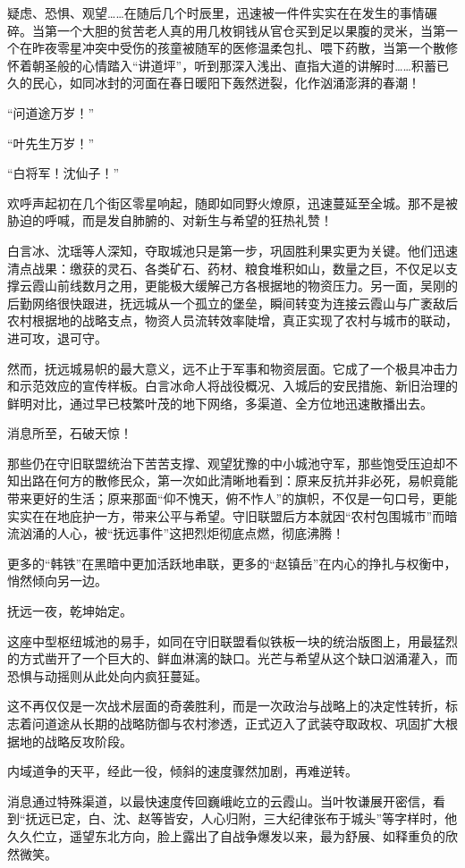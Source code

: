 疑虑、恐惧、观望……在随后几个时辰里，迅速被一件件实实在在发生的事情碾碎。当第一个大胆的贫苦老人真的用几枚铜钱从官仓买到足以果腹的灵米，当第一个在昨夜零星冲突中受伤的孩童被随军的医修温柔包扎、喂下药散，当第一个散修怀着朝圣般的心情踏入“讲道坪”，听到那深入浅出、直指大道的讲解时……积蓄已久的民心，如同冰封的河面在春日暖阳下轰然迸裂，化作汹涌澎湃的春潮！

“问道途万岁！”

“叶先生万岁！”

“白将军！沈仙子！”

欢呼声起初在几个街区零星响起，随即如同野火燎原，迅速蔓延至全城。那不是被胁迫的呼喊，而是发自肺腑的、对新生与希望的狂热礼赞！

白言冰、沈瑶等人深知，夺取城池只是第一步，巩固胜利果实更为关键。他们迅速清点战果：缴获的灵石、各类矿石、药材、粮食堆积如山，数量之巨，不仅足以支撑云霞山前线数月之用，更能极大缓解己方各根据地的物资压力。另一面，吴刚的后勤网络很快跟进，抚远城从一个孤立的堡垒，瞬间转变为连接云霞山与广袤敌后农村根据地的战略支点，物资人员流转效率陡增，真正实现了农村与城市的联动，进可攻，退可守。

然而，抚远城易帜的最大意义，远不止于军事和物资层面。它成了一个极具冲击力和示范效应的宣传样板。白言冰命人将战役概况、入城后的安民措施、新旧治理的鲜明对比，通过早已枝繁叶茂的地下网络，多渠道、全方位地迅速散播出去。

消息所至，石破天惊！

那些仍在守旧联盟统治下苦苦支撑、观望犹豫的中小城池守军，那些饱受压迫却不知出路在何方的散修民众，第一次如此清晰地看到：原来反抗并非必死，易帜竟能带来更好的生活；原来那面“仰不愧天，俯不怍人”的旗帜，不仅是一句口号，更能实实在在地庇护一方，带来公平与希望。守旧联盟后方本就因“农村包围城市”而暗流汹涌的人心，被“抚远事件”这把烈炬彻底点燃，彻底沸腾！

更多的“韩铁”在黑暗中更加活跃地串联，更多的“赵镇岳”在内心的挣扎与权衡中，悄然倾向另一边。

抚远一夜，乾坤始定。

这座中型枢纽城池的易手，如同在守旧联盟看似铁板一块的统治版图上，用最猛烈的方式凿开了一个巨大的、鲜血淋漓的缺口。光芒与希望从这个缺口汹涌灌入，而恐惧与动摇则从此处向内疯狂蔓延。

这不再仅仅是一次战术层面的奇袭胜利，而是一次政治与战略上的决定性转折，标志着问道途从长期的战略防御与农村渗透，正式迈入了武装夺取政权、巩固扩大根据地的战略反攻阶段。

内域道争的天平，经此一役，倾斜的速度骤然加剧，再难逆转。

消息通过特殊渠道，以最快速度传回巍峨屹立的云霞山。当叶牧谦展开密信，看到“抚远已定，白、沈、赵等皆安，人心归附，三大纪律张布于城头”等字样时，他久久伫立，遥望东北方向，脸上露出了自战争爆发以来，最为舒展、如释重负的欣然微笑。

